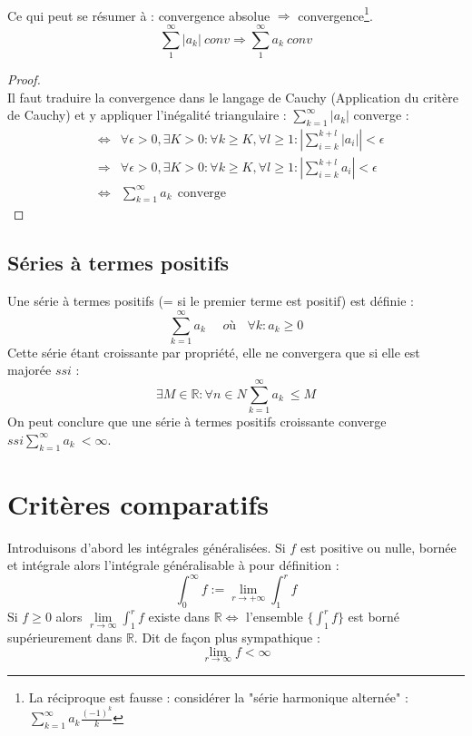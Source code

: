 \documentclass[11pt, a4paper, openany]{book}
\begin{document}
\ \\
		
Ce qui peut se résumer à : convergence absolue $\Rightarrow$ convergence\footnote{La réciproque est fausse : considérer la "série harmonique alternée" : $\sum_{k=1}^\infty a_k \frac{(-1)^k}{k}$}. $$\sum_1^{\infty}|a_k|\ conv\Rightarrow \sum_1^{\infty}a_k\ conv$$
\begin{proof}
	\ \\
	Il faut traduire la convergence dans le langage de Cauchy (Application du critère de Cauchy) et y appliquer l'inégalité triangulaire : $\sum_{k=1}^\infty |a_k|$ converge :
	\begin{eqnarray}
		&\Leftrightarrow & \forall \epsilon > 0, \exists K > 0 : \forall k \geq K, \forall l \geq 1 : \left|\sum_{i=k}^{k+l} |a_i| \right| < \epsilon\\
		&\Rightarrow & \forall \epsilon > 0, \exists K > 0 : \forall k \geq K, \forall l \geq 1 : \left|\sum_{i=k}^{k+l} a_i \right| < \epsilon\\
		&\Leftrightarrow & \sum_{k=1}^\infty a_k\ \ \text{converge}
	\end{eqnarray}
\end{proof}
		
		
\subsection{Séries à termes positifs}
Une série à termes positifs (= si le premier terme est positif) est définie :
\begin{equation}
	\sum_{k=1}^\infty a_k\ \ \ \ \ \ où\ \ \ \ \forall k : a_k \geq 0
\end{equation}
Cette série étant croissante par propriété, elle ne convergera que si elle est majorée $ssi$ : 
\begin{equation}
	\exists M \in \mathbb{R} : \forall n \in N \sum_{k=1}^\infty a_k\ \leq M
\end{equation}  On peut conclure que une série à termes positifs croissante converge $ssi \sum_{k=1}^\infty a_k\ < \infty$.
		
\section{Critères comparatifs}
Introduisons d'abord les intégrales généralisées. Si $f$ est positive ou nulle, bornée et intégrale alors l'intégrale généralisable à pour définition :
\begin{equation}
	\int_0^\infty f := \lim\limits_{r \rightarrow +\infty}  \int_1^r f
\end{equation}
Si $f \geq 0$ alors $\lim\limits_{r \rightarrow \infty}  \int_1^r f$ existe dans $\mathbb{R} \Leftrightarrow$ l'ensemble $\{\int_1^r f\}$ est borné supérieurement dans $\mathbb{R}$. Dit de façon plus sympathique :
\begin{equation}
	\lim\limits_{r \rightarrow \infty} f < \infty
\end{equation}
\end{document}

